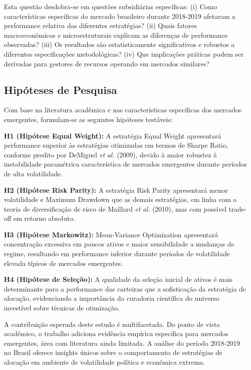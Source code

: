 Esta questão desdobra-se em questões subsidiárias específicas: (i) Como características específicas do mercado brasileiro durante 2018-2019 afetaram a performance relativa das diferentes estratégias? (ii) Quais fatores macroeconômicos e microestruturais explicam as diferenças de performance observadas? (iii) Os resultados são estatisticamente significativos e robustos a diferentes especificações metodológicas? (iv) Que implicações práticas podem ser derivadas para gestores de recursos operando em mercados similares?

\subsection{Hipóteses de Pesquisa}

Com base na literatura acadêmica e nas características específicas dos mercados emergentes, formulam-se as seguintes hipóteses testáveis:

\textbf{H1 (Hipótese Equal Weight):} A estratégia Equal Weight apresentará performance superior às estratégias otimizadas em termos de Sharpe Ratio, conforme predito por DeMiguel \textit{et al.} (2009), devido à maior robustez à instabilidade paramétrica característica de mercados emergentes durante períodos de alta volatilidade.

\textbf{H2 (Hipótese Risk Parity):} A estratégia Risk Parity apresentará menor volatilidade e Maximum Drawdown que as demais estratégias, em linha com a teoria de diversificação de risco de Maillard \textit{et al.} (2010), mas com possível trade-off em retorno absoluto.

\textbf{H3 (Hipótese Markowitz):} Mean-Variance Optimization apresentará concentração excessiva em poucos ativos e maior sensibilidade a mudanças de regime, resultando em performance inferior durante períodos de volatilidade elevada típicos de mercados emergentes.

\textbf{H4 (Hipótese de Seleção):} A qualidade da seleção inicial de ativos é mais determinante para a performance das carteiras que a sofisticação da estratégia de alocação, evidenciando a importância da curadoria científica do universo investível sobre técnicas de otimização.

A contribuição esperada deste estudo é multifacetada. Do ponto de vista acadêmico, o trabalho adiciona evidência empírica específica para mercados emergentes, área com literatura ainda limitada. A análise do período 2018-2019 no Brasil oferece insights únicos sobre o comportamento de estratégias de alocação em ambiente de volatilidade política e econômica extrema.


